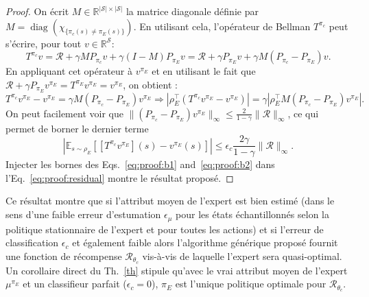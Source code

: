 \documentclass[english,utf8]{./hermes-journal}
\newcommand{\diag}{\operatorname*{diag}}
\newcommand{\R}{\mathcal{R}}
\newcommand{\s}{\mathcal{S}}
\newcommand{\E}{\mathbb{E}}
\begin{document}
\begin{proof}
  On écrit $M\in\mathbb{R}^{|\s|\times |\s|}$ la matrice diagonale définie par $M = \diag (\chi_{\{\pi_c(s)\neq\pi_E(s)\}})$. En utilisant cela, l'opérateur de Bellman $T^{\pi_c}$ peut s'écrire, pour tout $v\in\mathbb{R}^\s$:
  \begin{equation}
    T^{\pi_c}v = \R + \gamma M P_{\pi_c} v + \gamma (I-M)P_{\pi_E} v
    = \R + \gamma P_{\pi_E} v + \gamma M (P_{\pi_c}-P_{\pi_E})v.
  \end{equation}
  En appliquant cet opérateur à  $v^{\pi_E}$ et en utilisant le fait que $\R +
  \gamma P_{\pi_E} v^{\pi_E} = T^{\pi_E} v^{\pi_E} = v^{\pi_E}$, on obtient :
  \begin{equation}
    T^{\pi_c}v^{\pi_E} - v^{\pi_E} = \gamma M
    (P_{\pi_c}-P_{\pi_E})v^{\pi_E}
    \Rightarrow |\rho_E^\top (T^{\pi_c}v^{\pi_E} - v^{\pi_E})| = \gamma
    |\rho_E^\top M (P_{\pi_c}-P_{\pi_E})v^{\pi_E}|.
  \end{equation}
  On peut facilement voir que $\|(P_{\pi_c}-P_{\pi_E})v^{\pi_E}\|_\infty
  \leq \frac{2}{1-\gamma}\|\R\|_\infty$, ce qui permet de borner le dernier terme
  \begin{equation}
    |\E_{s\sim\rho_E}[[T^{\pi_c}v^{\pi_E}](s) - v^{\pi_E}(s)]| \leq
    \epsilon_c \frac{2\gamma}{1-\gamma} \|\R\|_\infty.
    \label{eq:proof:b2}
  \end{equation}
  Injecter les bornes des Eqs.~\eqref{eq:proof:b1}
  and~\eqref{eq:proof:b2} dans l'Eq.~\eqref{eq:proof:residual} montre le résultat proposé.%
\end{proof}

Ce résultat montre que si l'attribut moyen de l'expert est bien estimé (dans le sens d'une faible erreur d'estumation $\epsilon_\mu$ pour les états échantillonnés selon la politique stationnaire de l'expert et pour toutes les actions) et si l'erreur de classification $\epsilon_c$ et également faible alors l'algorithme générique proposé fournit une fonction de récompense 
$\R_{\theta_c}$ vis-à-vis de laquelle l'expert sera quasi-optimal. Un corollaire direct du Th.~\ref{th} stipule qu'avec le vrai attribut moyen de l'expert $\mu^{\pi_E}$ et un classifieur parfait 
($\epsilon_c=0$), $\pi_E$ est l'unique politique optimale pour 
$\R_{\theta_c}$.
\end{document}
